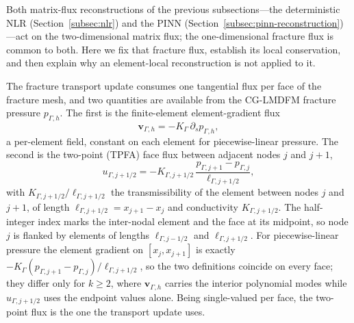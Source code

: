 \documentclass[a4paper,fleqn]{cas-sc}
\newcommand{\vflux}{\mathbf{v}}
\begin{document}
{\color{orange}
Both matrix-flux reconstructions of the previous subsections---the deterministic
NLR (Section~\ref{subsec:nlr}) and the PINN
(Section~\ref{subsec:pinn-reconstruction})---act on the two-dimensional matrix
flux; the one-dimensional fracture flux is common to both. Here we fix that
fracture flux, establish its local conservation, and then explain why an
element-local reconstruction is not applied to it.

The fracture transport update consumes one tangential flux per face of the fracture
mesh, and two quantities are available from the CG-LMDFM fracture pressure
\(p_{\Gamma,h}\). The first is the finite-element element-gradient flux
\[
  \vflux_{\Gamma,h}=-K_\Gamma\,\partial_s p_{\Gamma,h},
\]
a per-element field, constant on each element for piecewise-linear pressure. The
second is the two-point (TPFA) face flux between adjacent nodes \(j\) and \(j+1\),
\[
  u_{\Gamma,j+1/2}=-K_{\Gamma,j+1/2}\,
  \frac{p_{\Gamma,j+1}-p_{\Gamma,j}}{\ell_{\Gamma,j+1/2}},
\]
with \(K_{\Gamma,j+1/2}/\ell_{\Gamma,j+1/2}\) the transmissibility of the element
between nodes \(j\) and \(j+1\), of length \(\ell_{\Gamma,j+1/2}=x_{j+1}-x_j\) and
conductivity \(K_{\Gamma,j+1/2}\). The half-integer index marks the inter-nodal
element and the face at its midpoint, so node \(j\) is flanked by elements of lengths
\(\ell_{\Gamma,j-1/2}\) and \(\ell_{\Gamma,j+1/2}\). For piecewise-linear pressure the
element gradient
on \([x_j,x_{j+1}]\) is exactly
\(-K_\Gamma(p_{\Gamma,j+1}-p_{\Gamma,j})/\ell_{\Gamma,j+1/2}\), so the two definitions
coincide on every face; they differ only for \(k\ge2\), where \(\vflux_{\Gamma,h}\)
carries the interior polynomial modes while \(u_{\Gamma,j+1/2}\) uses the endpoint
values alone. Being single-valued per face, the two-point flux is the one the
transport update uses.

}
\end{document}

